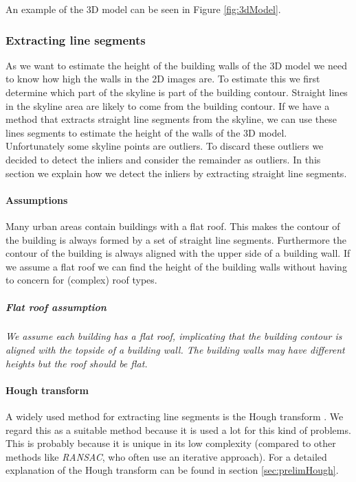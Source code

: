 An example of the 3D model can be seen in Figure
\ref{fig:3dModel}.





\subsubsection{Extracting line segments}
\label{extractinglinesegments}

	As we want to estimate the height of the building walls of the 3D model we
	need to know how high the walls in the 2D images are.  To estimate this we
	first determine which part of the skyline is part of the building contour.
	Straight lines in the skyline area are likely to come from the building
	contour.  If we have a method that extracts straight line segments from the
	skyline, we can use these lines segments to estimate the height of the walls
	of the 3D model.\\
	Unfortunately some skyline points are outliers. To discard these outliers
	we decided to detect the inliers and consider the remainder as outliers.  In this
	section we explain how we detect the inliers by extracting straight line
	segments.  \\

\paragraph{Assumptions}
	Many urban areas contain buildings with a flat roof. This makes the contour
	of the building is always formed by a set of straight line segments.
	Furthermore the contour of the building is always aligned with the upper side
	of a building wall.  
	If we assume a flat roof we can find the height of the building walls without
	having to concern for (complex) roof types.

	\subparagraph{Flat roof assumption}
	\emph{We assume each building has a flat roof, implicating that the building
	contour is aligned with the topside of a building wall.  The building walls
	may have different heights but the roof should be flat.}\\


\paragraph{Hough transform}
	A widely used method for extracting line segments is the Hough transform
	\cite{Hough}.
	We regard this as a suitable method because it is
	used a lot for this kind of problems. This is probably because it is unique
	in its low complexity (compared to other methods like
	\emph{RANSAC}, who often use an iterative approach).
	For a detailed explanation of the Hough transform can be found in section
	\ref{sec:prelimHough}.\\

